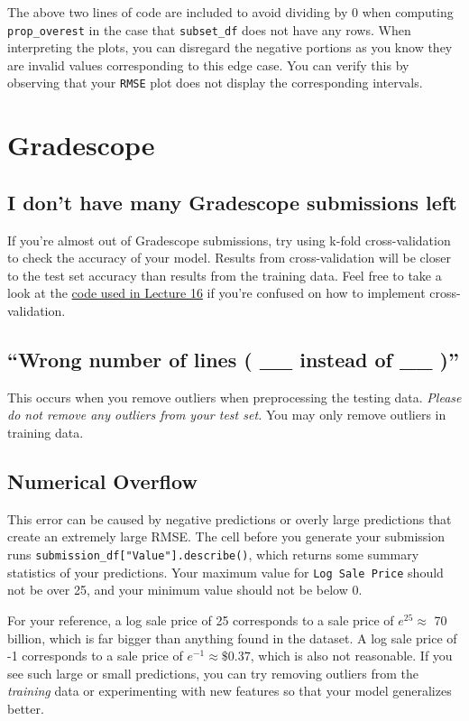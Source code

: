\documentclass[
  letterpaper,
  DIV=11,
  numbers=noendperiod]{scrreprt}
\begin{document}
The above two lines of code are included to avoid dividing by 0 when
computing \texttt{prop\_overest} in the case that \texttt{subset\_df}
does not have any rows. When interpreting the plots, you can disregard
the negative portions as you know they are invalid values corresponding
to this edge case. You can verify this by observing that your
\texttt{RMSE} plot does not display the corresponding intervals.

\section{Gradescope}\label{gradescope-1}

\subsection{I don't have many Gradescope submissions
left}\label{i-dont-have-many-gradescope-submissions-left}

If you're almost out of Gradescope submissions, try using k-fold
cross-validation to check the accuracy of your model. Results from
cross-validation will be closer to the test set accuracy than results
from the training data. Feel free to take a look at the
\href{https://ds100.org/fa24/resources/assets/lectures/lec16/lec16.html}{code
used in Lecture 16} if you're confused on how to implement
cross-validation.

\subsection{``Wrong number of lines ( \_\_ instead of \_\_
)''}\label{wrong-number-of-lines-__-instead-of-__}

This occurs when you remove outliers when preprocessing the testing
data. \emph{Please do not remove any outliers from your test set.} You
may only remove outliers in training data.

\subsection{Numerical Overflow}\label{numerical-overflow}

This error can be caused by negative predictions or overly large
predictions that create an extremely large RMSE. The cell before you
generate your submission runs
\texttt{submission\_df{[}"Value"{]}.describe()}, which returns some
summary statistics of your predictions. Your maximum value for
\texttt{Log\ Sale\ Price} should not be over 25, and your minimum value
should not be below 0.

For your reference, a log sale price of 25 corresponds to a sale price
of \(e^{25} \approx\) 70 billion, which is far bigger than anything
found in the dataset. A log sale price of -1 corresponds to a sale price
of \(e^{-1} \approx \$0.37\), which is also not reasonable. If you see
such large or small predictions, you can try removing outliers from the
\emph{training} data or experimenting with new features so that your
model generalizes better.
\end{document}
